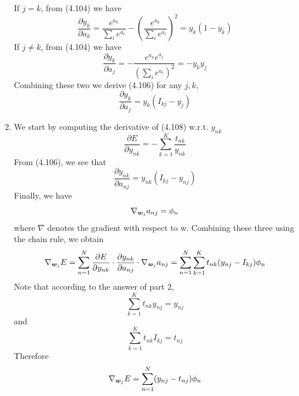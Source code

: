 \documentclass[submit]{harvardml}
\begin{document}
\begin{enumerate}
    If $j = k$, from (4.104) we have
    $$ \frac{\partial y_k}{\partial a_k} = \frac{e^{a_k}}{\sum_i e^{a_i}} - \left(\frac{e^{a_k}}{\sum_i e^{a_i}} \right)^2 = y_k(1-y_k) $$
    If $j \neq k$, from (4.104) we have
    $$ \frac{\partial y_k}{\partial a_j} = -\frac{e^{a_k}e^{a_j}}{\left(\sum_i e^{a_i}\right)^2} = -y_ky_j $$
    Combining these two we derive (4.106) for any $j, k$,
    $$ \frac{\partial y_k}{\partial a_j} = y_k(I_{kj} - y_j) $$
    \item We start by computing the derivative of (4.108) w.r.t. $y_{nk}$
    $$ \frac{\partial E}{\partial y_{nk}} = -\sum_{k=1}^{K}\frac{t_{nk}}{y_{nk}} $$
    From (4.106), we see that
    $$ \frac{\partial y_{nk}}{\partial a_{nj}} = y_{nk}(I_{kj} - y_{nj}) $$
    Finally, we have
    $$ \nabla_{\boldsymbol{w}_j} a_{nj} = \phi_n $$
    where $\nabla$ denotes the gradient with respect to w. Combining these three using the chain rule, we obtain
    $$ \nabla_{\boldsymbol{w}_j} E = \sum_{n=1}^N \frac{\partial E}{\partial y_{nk}} \cdot \frac{\partial y_{nk}}{\partial a_{nj}} \cdot \nabla_{\boldsymbol{w}_j} a_{nj} = \sum_{n=1}^{N} \sum_{k=1}^K t_{nk}(y_{nj} - I_{kj}) \phi_n $$
    Note that according to the answer of part 2, 
    $$ \sum_{k=1}^K t_{nk}y_{nj} = y_{nj} $$  
    and 
    $$ \sum_{k=1}^K t_{nk}I_{kj} = t_{nj} $$ 
    Therefore
    $$ \nabla_{\boldsymbol{w}_j} E = \sum_{n=1}^{N} (y_{nj} - t_{nj}) \phi_n $$
\end{enumerate}
\end{document}
